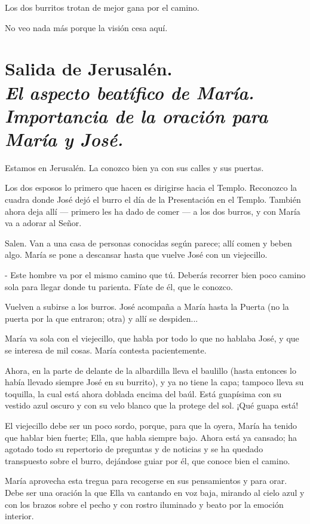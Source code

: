 \documentclass[12pt]{book} %
\begin{document}
Los dos burritos trotan de mejor gana por el camino. 

No veo nada más porque la visión cesa aquí. 

\chapter*{Salida de Jerusalén. \\ \normalfont\normalsize\textit{El aspecto beatífico de María. Importancia de la oración para María y José.}}

Estamos en Jerusalén. La conozco bien ya con sus calles y sus puertas. 

Los dos esposos lo primero que hacen es dirigirse hacia el Templo. Reconozco la cuadra donde José dejó el burro el día de la Presentación en el Templo. También ahora deja allí — primero les ha dado de comer — a los dos burros, y con María va a adorar al Señor. 

Salen. Van a una casa de personas conocidas según parece; allí comen y beben algo. María se pone a descansar hasta que vuelve José con un viejecillo. 

- Este hombre va por el mismo camino que tú. Deberás recorrer bien poco camino sola para llegar donde tu parienta. Fíate de él, que le conozco. 

Vuelven a subirse a los burros. José acompaña a María hasta la Puerta (no la puerta por la que entraron; otra) y allí se despiden... 

María va sola con el viejecillo, que habla por todo lo que no hablaba José, y que se interesa de mil cosas. María contesta pacientemente. 

Ahora, en la parte de delante de la albardilla lleva el baulillo (hasta entonces lo había llevado siempre José en su burrito), y ya no tiene la capa; tampoco lleva su toquilla, la cual está ahora doblada encima del baúl. Está guapísima con su vestido azul oscuro y con su velo blanco que la protege del sol. ¡Qué guapa está! 

El viejecillo debe ser un poco sordo, porque, para que la oyera, María ha tenido que hablar bien fuerte; Ella, que habla siempre bajo. Ahora está ya cansado; ha agotado todo su repertorio de preguntas y de noticias y se ha quedado transpuesto sobre el burro, dejándose guiar por él, que conoce bien el camino. 

María aprovecha esta tregua para recogerse en sus pensamientos y para orar. Debe ser una oración la que Ella va cantando en voz baja, mirando al cielo azul y con los brazos sobre el pecho y con rostro iluminado y beato por la emoción interior. 
\end{document}

